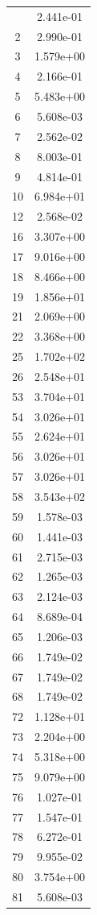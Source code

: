 \documentclass[12pt]{article}
\begin{document}
\begin{longtable}{@{}cc@{}}
\bottomrule
\endlastfoot
1 & 2.441e-01 \\
2 & 2.990e-01 \\
3 & 1.579e+00 \\
4 & 2.166e-01 \\
5 & 5.483e+00 \\
6 & 5.608e-03 \\
7 & 2.562e-02 \\
8 & 8.003e-01 \\
9 & 4.814e-01 \\
10 & 6.984e+01 \\
12 & 2.568e-02 \\
16 & 3.307e+00 \\
17 & 9.016e+00 \\
18 & 8.466e+00 \\
19 & 1.856e+01 \\
21 & 2.069e+00 \\
22 & 3.368e+00 \\
25 & 1.702e+02 \\
26 & 2.548e+01 \\
53 & 3.704e+01 \\
54 & 3.026e+01 \\
55 & 2.624e+01 \\
56 & 3.026e+01 \\
57 & 3.026e+01 \\
58 & 3.543e+02 \\
59 & 1.578e-03 \\
60 & 1.441e-03 \\
61 & 2.715e-03 \\
62 & 1.265e-03 \\
63 & 2.124e-03 \\
64 & 8.689e-04 \\
65 & 1.206e-03 \\
66 & 1.749e-02 \\
67 & 1.749e-02 \\
68 & 1.749e-02 \\
72 & 1.128e+01 \\
73 & 2.204e+00 \\
74 & 5.318e+00 \\
75 & 9.079e+00 \\
76 & 1.027e-01 \\
77 & 1.547e-01 \\
78 & 6.272e-01 \\
79 & 9.955e-02 \\
80 & 3.754e+00 \\
81 & 5.608e-03 \\

\end{longtable}
\end{document}
